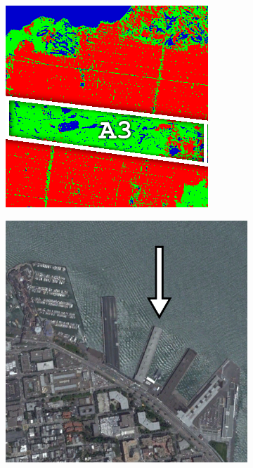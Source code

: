 \begin{figure}[tbp]
\begin{subfigure}[t]{0.19\textwidth}
\includegraphics[width=\columnwidth]{Figures/ALOS2_SF_3Class/Sunset}
\caption{}
\label{fig:cla2_e}
\end{subfigure}
\begin{subfigure}[t]{0.19\textwidth}
\includegraphics[width=\columnwidth]{Figures/ALOS2_SF_3Class/JettyIm} 

\end{subfigure}
\end{figure}
